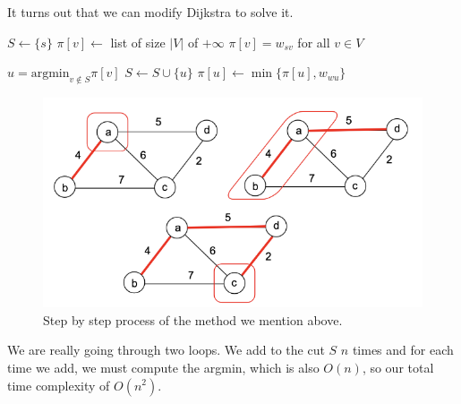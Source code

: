 \documentclass{article}
\begin{document}
      \begin{algo}
        It turns out that we can modify Dijkstra to solve it. 
        \begin{algorithm}[H]
          \label{alg:prim}
          \begin{algorithmic}[1]

              \State $S \gets \{s\}$  
              \State $\pi[v] \gets$ list of size $|V|$ of $+\infty$ 
              \State $\pi[v] = w_{sv}$ for all $v \in V$ 

                \State $u = \mathrm{argmin}_{v \notin S} \pi[v]$ 
                \State $S \gets S \cup \{u\}$ 
                 
                  \State $\pi[u] \gets \min\{\pi[u], w_{wu}\}$  
                \EndFor {}
              \EndWhile
              
            \EndFunction
          \end{algorithmic}
        \end{algorithm}

        \begin{figure}[H]
          \centering 
          \includegraphics[scale=0.6]{img/prim.png}
          \caption{Step by step process of the method we mention above.} 
          \label{fig:prim}
        \end{figure}
        We are really going through two loops. We add to the cut $S$ $n$ times and for each time we add, we must compute the argmin, which is also $O(n)$, so our total time complexity of $O(n^2)$.  
      \end{algo}
\end{document}
